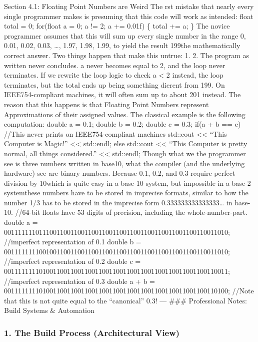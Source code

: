 Section 4.1: Floating Point Numbers are Weird The rst mistake that
nearly every single programmer makes is presuming that this code will
work as intended: float total = 0; for(float a = 0; a != 2; a += 0.01f)
\{ total += a; \} The novice programmer assumes that this will sum up
every single number in the range 0, 0.01, 0.02, 0.03, \ldots, 1.97,
1.98, 1.99, to yield the result 199the mathematically correct answer.
Two things happen that make this untrue: 1. 2. The program as written
never concludes. a never becomes equal to 2, and the loop never
terminates. If we rewrite the loop logic to check a \textless{} 2
instead, the loop terminates, but the total ends up being something
dierent from 199. On IEEE754-compliant machines, it will often sum up to
about 201 instead. The reason that this happens is that Floating Point
Numbers represent Approximations of their assigned values. The classical
example is the following computation: double a = 0.1; double b = 0.2;
double c = 0.3; if(a + b == c) //This never prints on IEEE754-compliant
machines std::cout \textless\textless{} ``This Computer is Magic!''
\textless\textless{} std::endl; else std::cout \textless\textless{}
``This Computer is pretty normal, all things considered.''
\textless\textless{} std::endl; Though what we the programmer see is
three numbers written in base10, what the compiler (and the underlying
hardware) see are binary numbers. Because 0.1, 0.2, and 0.3 require
perfect division by 10which is quite easy in a base-10 system, but
impossible in a base-2 systemthese numbers have to be stored in
imprecise formats, similar to how the number 1/3 has to be stored in the
imprecise form 0.333333333333333\ldots{} in base-10. //64-bit floats
have 53 digits of precision, including the whole-number-part. double a =
0011111110111001100110011001100110011001100110011001100110011010;
//imperfect representation of 0.1 double b =
0011111111001001100110011001100110011001100110011001100110011010;
//imperfect representation of 0.2 double c =
0011111111010011001100110011001100110011001100110011001100110011;
//imperfect representation of 0.3 double a + b =
0011111111010011001100110011001100110011001100110011001100110100; //Note
that this is not quite equal to the ``canonical'' 0.3! --- \#\#\#
Professional Notes: Build Systems \& Automation

\hypertarget{the-build-process-architectural-view}{%
\subsubsection{1. The Build Process (Architectural
View)}\label{the-build-process-architectural-view}}

